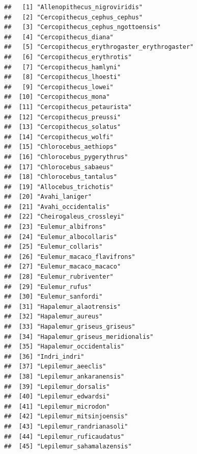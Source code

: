 \documentclass[]{article}
\begin{document}
\begin{verbatim}
##   [1] "Allenopithecus_nigroviridis"                  
##   [2] "Cercopithecus_cephus_cephus"                  
##   [3] "Cercopithecus_cephus_ngottoensis"             
##   [4] "Cercopithecus_diana"                          
##   [5] "Cercopithecus_erythrogaster_erythrogaster"    
##   [6] "Cercopithecus_erythrotis"                     
##   [7] "Cercopithecus_hamlyni"                        
##   [8] "Cercopithecus_lhoesti"                        
##   [9] "Cercopithecus_lowei"                          
##  [10] "Cercopithecus_mona"                           
##  [11] "Cercopithecus_petaurista"                     
##  [12] "Cercopithecus_preussi"                        
##  [13] "Cercopithecus_solatus"                        
##  [14] "Cercopithecus_wolfi"                          
##  [15] "Chlorocebus_aethiops"                         
##  [16] "Chlorocebus_pygerythrus"                      
##  [17] "Chlorocebus_sabaeus"                          
##  [18] "Chlorocebus_tantalus"                         
##  [19] "Allocebus_trichotis"                          
##  [20] "Avahi_laniger"                                
##  [21] "Avahi_occidentalis"                           
##  [22] "Cheirogaleus_crossleyi"                       
##  [23] "Eulemur_albifrons"                            
##  [24] "Eulemur_albocollaris"                         
##  [25] "Eulemur_collaris"                             
##  [26] "Eulemur_macaco_flavifrons"                    
##  [27] "Eulemur_macaco_macaco"                        
##  [28] "Eulemur_rubriventer"                          
##  [29] "Eulemur_rufus"                                
##  [30] "Eulemur_sanfordi"                             
##  [31] "Hapalemur_alaotrensis"                        
##  [32] "Hapalemur_aureus"                             
##  [33] "Hapalemur_griseus_griseus"                    
##  [34] "Hapalemur_griseus_meridionalis"               
##  [35] "Hapalemur_occidentalis"                       
##  [36] "Indri_indri"                                  
##  [37] "Lepilemur_aeeclis"                            
##  [38] "Lepilemur_ankaranensis"                       
##  [39] "Lepilemur_dorsalis"                           
##  [40] "Lepilemur_edwardsi"                           
##  [41] "Lepilemur_microdon"                           
##  [42] "Lepilemur_mitsinjoensis"                      
##  [43] "Lepilemur_randrianasoli"                      
##  [44] "Lepilemur_ruficaudatus"                       
##  [45] "Lepilemur_sahamalazensis"                     

\end{verbatim}
\end{document}
